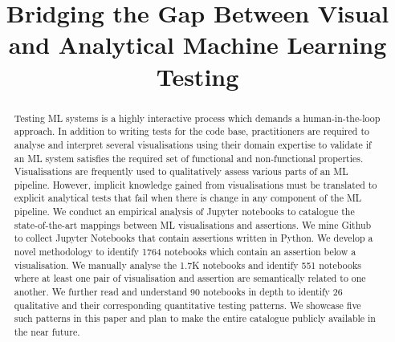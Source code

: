 \documentclass[conference]{IEEEtran}
\begin{document}
\title{Bridging the Gap Between Visual and Analytical Machine Learning
  Testing}

\author{
\and
{}
\and
{}
}

\maketitle

\begin{abstract}
Testing ML systems is a highly interactive process which demands a
human-in-the-loop approach. In addition to writing tests for the code
base, practitioners are required to analyse and interpret several
visualisations using their domain expertise to validate if an ML
system satisfies the required set of functional and non-functional
properties. Visualisations are frequently used to qualitatively assess
various parts of an ML pipeline. However, implicit knowledge gained
from visualisations must be translated to explicit analytical tests
that fail when there is change in any component of the ML pipeline. We
conduct an empirical analysis of Jupyter notebooks to catalogue the
state-of-the-art mappings between ML visualisations and assertions. We
mine Github to collect Jupyter Notebooks that contain assertions
written in Python. We develop a novel methodology to identify 1764
notebooks which contain an assertion below a visualisation. We
manually analyse the 1.7K notebooks and identify 551 notebooks where
at least one pair of visualisation and assertion are semantically
related to one another. We further read and understand 90 notebooks in
depth to identify 26 qualitative and their corresponding quantitative
testing patterns. We showcase five such patterns in this paper and
plan to make the entire catalogue publicly available in the near
future.
\end{abstract}
\end{document}
